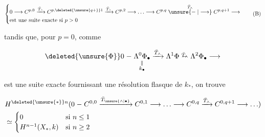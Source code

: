 \[
\left\{\begin{aligned}
&0\longrightarrow C^{p,0}\xrightarrow{\bar T_\wedge}C^{p,\deleted{\unsure{q+}}1}
 \xrightarrow{\bar T_\wedge}C^{p,2}\longrightarrow\ldots
 \longrightarrow C^{p,q}\mathrel{\overset{\bar T_\wedge}{\unsure{\relbar|\longrightarrow}}}C^{p,q+1}\longrightarrow\\
&\text{est une suite exacte si }p>0
\end{aligned}\right.\tag*{(B)}
\]

tandis que, pour $p=0$, comme

\[
\deleted{\unsure{\Phi}}0\relbar\underset{\substack{\Vert\\k_\bullet}}{\Lambda^0\Phi_\bullet}
\xrightarrow{\bar T_\wedge}\Lambda^1\Phi\mathrel{\overset{\bar T_\wedge}{\relbar}}\Lambda^2\Phi_\bullet\longrightarrow
\]

est une suite exacte fournissant une résolution flasque de $k_*$, on trouve

\[
\begin{aligned}
&H^{\deleted{\unsure{*}}n}(0\relbar C^{0,0}\xrightarrow{\bar T_{\unsure{\wedge|\bullet}}}C^{0,1}\longrightarrow\ldots
\longrightarrow C^{0,q}\xrightarrow{\bar T_\wedge}C^{0,q+1}\longrightarrow\ldots)\\
&\simeq\begin{cases}0&\text{si }n\leq1\\ H^{n-1}(X_*,k)&\text{si }n\geq2\end{cases}
\end{aligned}
\]

